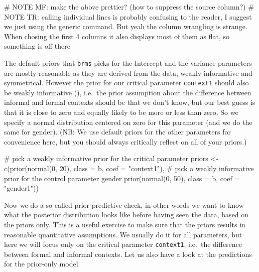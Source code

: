 \documentclass[
  doc,
  floatsintext,
  longtable,
  nolmodern,
  notxfonts,
  notimes,
  colorlinks=true,linkcolor=blue,citecolor=blue,urlcolor=blue]{apa7}
\newenvironment{Shaded}{\begin{snugshade}}{\end{snugshade}}
\newcommand{\AlertTok}[1]{\textcolor[rgb]{0.68,0.00,0.00}{#1}}
\newcommand{\AttributeTok}[1]{\textcolor[rgb]{0.40,0.45,0.13}{#1}}
\newcommand{\CommentTok}[1]{\textcolor[rgb]{0.37,0.37,0.37}{#1}}
\newcommand{\DecValTok}[1]{\textcolor[rgb]{0.68,0.00,0.00}{#1}}
\newcommand{\FunctionTok}[1]{\textcolor[rgb]{0.28,0.35,0.67}{#1}}
\newcommand{\NormalTok}[1]{\textcolor[rgb]{0.00,0.23,0.31}{#1}}
\newcommand{\OtherTok}[1]{\textcolor[rgb]{0.00,0.23,0.31}{#1}}
\newcommand{\StringTok}[1]{\textcolor[rgb]{0.13,0.47,0.30}{#1}}
\begin{document}
\begin{Shaded}
\begin{Highlighting}[]
\CommentTok{\# }\AlertTok{NOTE}\CommentTok{ MF: make the above prettier? (how to suppress the \textasciigrave{}source\textasciigrave{} column?)}
\CommentTok{\# }\AlertTok{NOTE}\CommentTok{ TR: calling individual lines is probably confusing to the reader, I suggest we just using the generic command. But yeah the column wrangling is strange. When chosing the first 4 columns it also displays most of them as flat, so something is off there}
\end{Highlighting}
\end{Shaded}

The default priors that \texttt{brms} picks for the Intercept and the
variance parameters are mostly reasonable as they are derived from the
data, weakly informative and symmetrical. However the prior for our
critical parameter \texttt{context1} should also be weakly informative
(), i.e.~the prior assumption about the difference between informal
and formal contexts should be that we don't know, but our best guess is
that it is close to zero and equally likely to be more or less than
zero. So we specify a normal distribution centered on zero for this
parameter (and we do the same for gender). (NB: We use default priors
for the other parameters for convenience here, but you should always
critically reflect on all of your priors.)

\begin{Shaded}
\begin{Highlighting}[]
\CommentTok{\# pick a weakly informative prior for the critical parameter}
\NormalTok{priors }\OtherTok{\textless{}{-}} \FunctionTok{c}\NormalTok{(}\FunctionTok{prior}\NormalTok{(}\FunctionTok{normal}\NormalTok{(}\DecValTok{0}\NormalTok{, }\DecValTok{20}\NormalTok{), }
                \AttributeTok{class =}\NormalTok{ b, }
                \AttributeTok{coef =} \StringTok{"context1"}\NormalTok{),}
            \CommentTok{\# pick a weakly informative prior for the control parameter gender}
            \FunctionTok{prior}\NormalTok{(}\FunctionTok{normal}\NormalTok{(}\DecValTok{0}\NormalTok{, }\DecValTok{50}\NormalTok{), }
                \AttributeTok{class =}\NormalTok{ b, }
                \AttributeTok{coef =} \StringTok{"gender1"}\NormalTok{))}
\end{Highlighting}
\end{Shaded}

Now we do a so-called prior predictive check, in other words we want to
know what the posterior distribution looks like before having seen the
data, based on the priors only. This is a useful exercise to make sure
that the priors results in reasonable quantitative assumptions. We
usually do it for all parameters, but here we will focus only on the
critical parameter \texttt{context1}, i.e.~the difference between formal
and informal contexts. Let us also have a look at the predictions for
the prior-only model.
\end{document}

